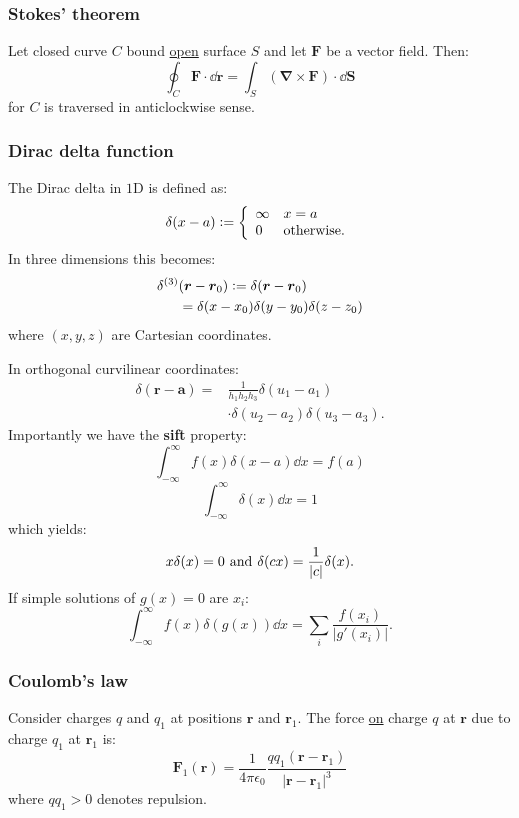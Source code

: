 \documentclass{article}
\newcommand{\deq}{\vcentcolon=}
\newcommand{\vc}[1]{\boldsymbol{#1}}
\begin{document}
\begin{multicols*}{3}
\subsubsection*{Stokes' theorem}
Let closed curve $C$ bound \underline{open} surface $S$
and let $\vc{F}$ be a vector field. Then:
$$\oint_C \vc{F}\cdot\dd\vc{r}
=\int_S (\vc{\nabla}\times\vc{F})\cdot\dd\vc{S}$$
for $C$ is traversed in anticlockwise sense.

\subsubsection*{Dirac delta function}
The Dirac delta in $1$D is defined as:
$$\delta(x-a)\deq\left\{\begin{array}{ll}
    \infty & x=a \\
    0 & \text{otherwise}.
\end{array}\right.$$
In three dimensions this becomes:
\begin{align*}
    \delta^{(3)}&(\vc{r}-\vc{r}_0)
    \deq\delta(\vc{r}-\vc{r}_0) \\
    &=\delta(x-x_0)\delta(y-y_0)\delta(z-z_0)
\end{align*}
where $(x,y,z)$ are Cartesian coordinates.

In orthogonal curvilinear coordinates:
\begin{align*}
    \delta(\vc{r}-\vc{a})
    =&\frac{1}{h_1 h_2 h_3}\delta(u_1-a_1) \\
    &\cdot\delta(u_2-a_2)\delta(u_3-a_3).
\end{align*}
Importantly we have the \textbf{sift} property:
$$\int_{-\infty}^{\infty}f(x)\delta(x-a)\dd x=f(a)$$
$$\int_{-\infty}^{\infty}\delta(x)\dd x=1$$
which yields:
$$x\delta(x)=0
\hspace{0.05in}\text{and}\hspace{0.05in}
\delta(cx)=\frac{1}{|c|}\delta(x).$$
If simple solutions of $g(x)=0$ are $x_i$:
$$\int_{-\infty}^{\infty}f(x)\delta(g(x))\dd x
=\sum_i\frac{f(x_i)}{|g'(x_i)|}.$$

\subsubsection*{Coulomb's law}
Consider charges $q$ and $q_1$ at positions
$\vc{r}$ and $\vc{r}_1$.
The force \underline{on} charge $q$ at $\vc{r}$
due to charge $q_1$ at $\vc{r}_1$ is:
$$\vc{F}_1(\vc{r})=\frac{1}{4\pi\epsilon_0}
\frac{q q_1(\vc{r}-\vc{r}_1)}{|\vc{r}-\vc{r}_1|^3}$$
where $q q_1>0$ denotes repulsion.


\end{multicols*}
\end{document}
